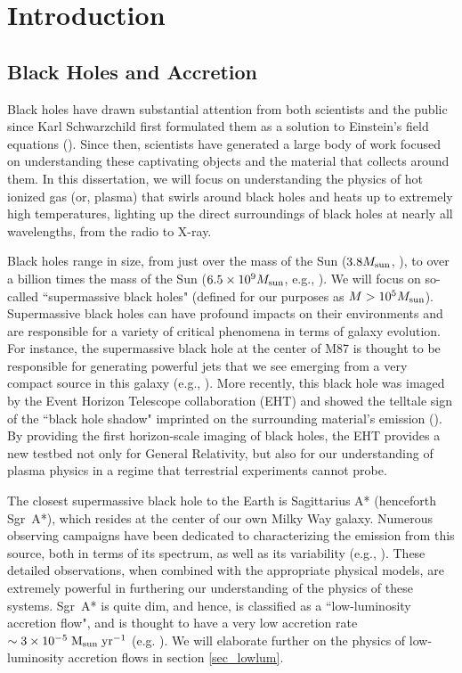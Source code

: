 \chapter[Introduction]
{Introduction}
\section{Black Holes and Accretion}

Black holes have drawn substantial attention from both scientists and the public since Karl Schwarzchild first formulated them as a solution to Einstein's field equations (\citealt{schwarzschild1916}).  Since then, scientists have generated a large body of work focused on understanding these captivating objects and the material that collects around them.  In this dissertation, we will focus on understanding the physics of hot ionized gas (or, plasma) that swirls around black holes and heats up to extremely high temperatures, lighting up the direct surroundings of black holes at nearly all wavelengths, from the radio to X-ray.  

Black holes range in size, from just over the mass of the Sun ($3.8 M_{\rm{sun}}$, \citealt{smallbh}), to over a billion times the mass of the Sun ($6.5\times10^9 M_{\rm{sun}}$, e.g., \citealt{eht6}).  We will focus on so-called ``supermassive black holes" (defined for our purposes as $M>10^5 M_{\rm{sun}}$).  Supermassive black holes can have profound impacts on their environments and are responsible for a variety of critical phenomena in terms of galaxy evolution.  For instance, the supermassive black hole at the center of M87 is thought to be responsible for generating powerful jets that we see emerging from a very compact source in this galaxy (e.g., \citealt{sparks1996}).  More recently, this black hole was imaged by the Event Horizon Telescope collaboration (EHT) and showed the telltale sign of the ``black hole shadow" imprinted on the surrounding material's emission (\citealt{eht6}).  By providing the first horizon-scale imaging of black holes, the EHT provides a new testbed not only for General Relativity, but also for our understanding of plasma physics in a regime that terrestrial experiments cannot probe.

The closest supermassive black hole to the Earth is Sagittarius A* (henceforth Sgr~A*), which resides at the center of our own Milky Way galaxy.  Numerous observing campaigns have been dedicated to characterizing the emission from this source, both in terms of its spectrum, as well as its variability (e.g., \citealt{bower2015}).  These detailed observations, when combined with the appropriate physical models, are extremely powerful in furthering our understanding of the physics of these systems.  Sgr~A* is quite dim, and hence, is classified as a ``low-luminosity accretion flow", and is thought to have a very low accretion rate $\sim 3 \times 10^{-5} \; \rm{M_{sun}} \; \rm{yr}^{-1}$ (e.g. \citealt{quataert1999b}).  We will elaborate further on the physics of low-luminosity accretion flows in section \ref{sec_lowlum}.

